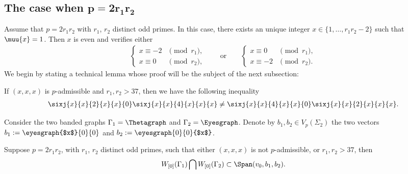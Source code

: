 \subsection[The case when $p=2r_1r_2$]{The case when $\boldsymbol{p=2r_1r_2}$}

Assume that $p=2r_1r_2$ with $r_1$, $r_2$ distinct odd primes. In this case, there exists an unique integer $x\in \{ 1, \ldots, r_1r_2-2\}$ such that $\muu{x}=1$. Then $x$ is even and verifies either
\begin{gather*}\begin{cases}
x\equiv -2 &\pmod{r_1}, \\
x\equiv 0 & \pmod{r_2},
\end{cases} \qquad \text{or}\qquad \begin{cases}
x\equiv 0 &\pmod{r_1}, \\
x\equiv -2 & \pmod{r_2}.
\end{cases}\end{gather*}
We begin by stating a technical lemma whose proof will be the subject of the next subsection:
\begin{Lemma}\label{GA}
 If $(x,x,x)$ is $p$-admissible and $r_1,r_2>37$, then we have the following inequality
\begin{gather*} \sixj{x}{x}{2}{x}{x}{0} \sixj{x}{x}{4}{x}{x}{x} \neq \sixj{x}{x}{4}{x}{x}{0}\sixj{x}{x}{2}{x}{x}{x}.\end{gather*}
\end{Lemma}

 Consider the two banded graphs $\Gamma_1= \Thetagraph$ and $\Gamma_2=\Eyesgraph$. Denote by $b_1, b_2 \in V_p(\Sigma_2)$ the two vectors $b_1:= \eyesgraph{$x$}{0}{0}$ and $b_2 := \eyesgraph{0}{0}{$x$}$.

\begin{Lemma}\label{lemma_2r1r2}
Suppose $p=2r_1r_2$, with $r_1$, $r_2$ distinct odd primes, such that either $(x,x,x)$ is not $p$-admissible, or $r_1,r_2>37$, then
\begin{gather*} W_{[0]}(\Gamma_1) \bigcap W_{[0]}(\Gamma_2) \subset \Span ( v_0, b_1, b_2 ).\end{gather*}
\end{Lemma}

